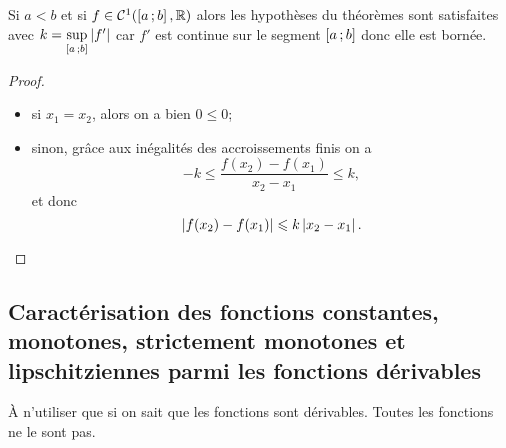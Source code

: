 Si \(a < b\) et si \(f \in \mathcal{C}^{1}(\left[ a \, ; {} b \right], \mathbb{R})\) alors les 
hypothèses du théorèmes sont satisfaites avec 
\(k=\sup\limits_{\left[ a \, ; {} b \right]}\left\lvert f'\right\rvert\) car \(f'\) est continue sur le 
segment \(\left[ a \, ; {} b \right]\) donc elle est bornée.

\begin{proof}
  \begin{itemize}
    \item si \(x_1=x_2\), alors on a bien \(0 \leqslant 0\);
    \item sinon, grâce aux inégalités des accroissements finis on a
      \begin{equation}
        -k \leqslant \frac{f(x_2)-f(x_1)}{x_2-x_1} \leqslant k,
      \end{equation}
      et donc
      \begin{equation}
        \left\lvert f(x_2)-f(x_1)\right\rvert \leqslant k\left\lvert x_2-x_1\right\rvert.
      \end{equation}
  \end{itemize}
\end{proof}

\subsection{Caractérisation des fonctions constantes, monotones, strictement 
monotones et lipschitziennes parmi les fonctions dérivables}

À n'utiliser que si on sait que les fonctions sont dérivables. Toutes les 
fonctions ne le sont pas.

